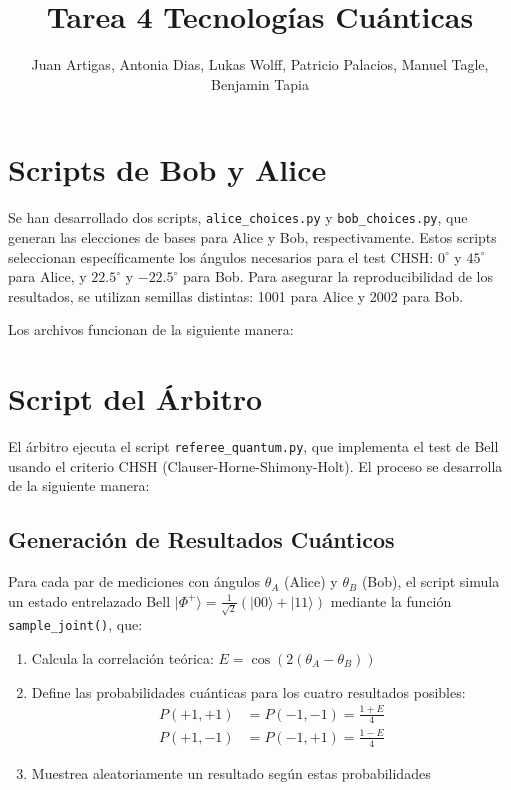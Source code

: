 \documentclass[11pt]{article}
\title{Tarea 4 Tecnologías Cuánticas}
\author{Juan Artigas,
    Antonia Dias,
    Lukas Wolff,
    Patricio Palacios,
    Manuel Tagle,
    Benjamin Tapia}
\date{}
\begin{document}
\maketitle

\section{Scripts de Bob y Alice}

Se han desarrollado dos scripts, \texttt{alice\_choices.py} y \texttt{bob\_choices.py}, que generan las elecciones de bases para Alice y Bob, respectivamente. Estos scripts seleccionan específicamente los ángulos necesarios para el test CHSH: $0^\circ$ y $45^\circ$ para Alice, y $22.5^\circ$ y $-22.5^\circ$ para Bob. Para asegurar la reproducibilidad de los resultados, se utilizan semillas distintas: 1001 para Alice y 2002 para Bob.

Los archivos funcionan de la siguiente manera:

\section{Script del Árbitro}

El árbitro ejecuta el script \texttt{referee\_quantum.py}, que implementa el test de Bell usando el criterio CHSH (Clauser-Horne-Shimony-Holt). El proceso se desarrolla de la siguiente manera:

\subsection{Generación de Resultados Cuánticos}

Para cada par de mediciones con ángulos $\theta_A$ (Alice) y $\theta_B$ (Bob), el script simula un estado entrelazado Bell $|\Phi^+\rangle = \frac{1}{\sqrt{2}}(|00\rangle + |11\rangle)$ mediante la función \texttt{sample\_joint()}, que:

\begin{enumerate}
    \item Calcula la correlación teórica: $E = \cos(2(\theta_A - \theta_B))$
    \item Define las probabilidades cuánticas para los cuatro resultados posibles:
    \begin{align}
        P(+1,+1) &= P(-1,-1) = \frac{1+E}{4} \\
        P(+1,-1) &= P(-1,+1) = \frac{1-E}{4}
    \end{align}
    \item Muestrea aleatoriamente un resultado según estas probabilidades
\end{enumerate}
\end{document}
